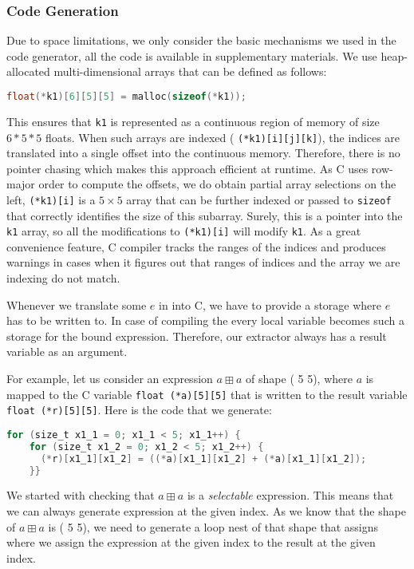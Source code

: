 \subsubsection{Code Generation}
Due to space limitations, we only consider the basic mechanisms we used in the
code generator, all the code is available in supplementary materials.  We use
heap-allocated multi-dimensional arrays that can be defined as follows:
\begin{lstlisting}[language=C]
  float(*k1)[6][5][5] = malloc(sizeof(*k1));
\end{lstlisting}
This ensures that \texttt{k1} is represented as a continuous region of memory
of size $6*5*5$ floats.  When such arrays are indexed (\eg{} \texttt{(*k1)[i][j][k]}),
the indices are translated into a single offset into the continuous memory.
Therefore, there is no pointer chasing which makes this approach efficient at
runtime.  As C uses row-major order to compute the offsets, we do obtain
partial array selections on the left, \eg \texttt{(*k1)[i]} is a $5\times 5$
array that can be further indexed or passed to \texttt{sizeof} that correctly
identifies the size of this subarray.  Surely, this is a pointer into the \texttt{k1}
array, so all the modifications to \texttt{(*k1)[i]} will modify \texttt{k1}.
As a great convenience feature, C compiler tracks the ranges of the indices
and produces warnings in cases when it figures out that ranges of indices
and the array we are indexing do not match.

Whenever we translate some $e$ in  into C, we have to provide a storage
where $e$ has to be written to.  In case of compiling the  every
local variable becomes such a storage for the bound expression.  Therefore,
our extractor always has a result variable as an argument.

For example, let us consider an expression $a ⊞ a$ of shape
( 5   5), where $a$ is mapped to the C variable
\texttt{float (*a)[5][5]} that is written to the result variable
\texttt{float (*r)[5][5]}.  Here is the code that we generate:
\begin{lstlisting}[language=C]
  for (size_t x1_1 = 0; x1_1 < 5; x1_1++) { 
    for (size_t x1_2 = 0; x1_2 < 5; x1_2++) { 
      (*r)[x1_1][x1_2] = ((*a)[x1_1][x1_2] + (*a)[x1_1][x1_2]);
    }}
\end{lstlisting}
We started with checking that $a ⊞ a$ is a \emph{selectable} expression.
This means that we can always generate expression at the given index.
As we know that the shape of $a ⊞ a$ is ( 5   5),
we need to generate a loop nest of that shape that assigns where
we assign the expression at the given index to the result at the given
index.

